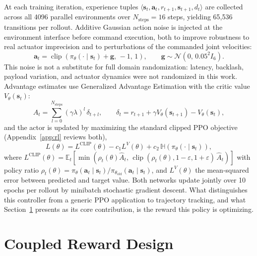 At each training iteration, experience tuples $\langle \mathbf{s}_t, \mathbf{a}_t, r_{t+1},
\mathbf{s}_{t+1}, d_t \rangle$ are collected across all 4096 parallel environments over
$N_{\text{steps}} = 16$ steps, yielding 65{,}536 transitions per rollout. Additive Gaussian action
noise is injected at the environment interface before command execution, both to improve robustness
to real actuator imprecision and to perturbations of the commanded joint velocities:
\begin{equation}
\mathbf{a}_t = \operatorname{clip}\left( \pi_\theta(\cdot \mid \mathbf{s}_t) + \mathbf{g},\, -1,\, 1 \right),
\qquad \mathbf{g} \sim \mathcal{N}(0,\, 0.05^2 I_6).
\label{eq:dikppo_actionnoise}
\end{equation}
This noise is not a substitute for full domain randomization: latency, backlash, payload variation,
and actuator dynamics were not randomized in this work. Advantage estimates use Generalized Advantage
Estimation with the critic value $V_\theta(\mathbf{s}_t)$:
\begin{equation}
\hat{A}_t = \sum_{l=0}^{N_{\text{steps}}} (\gamma \lambda)^l\, \delta_{t+l}, \qquad
\delta_t = r_{t+1} + \gamma V_\theta(\mathbf{s}_{t+1}) - V_\theta(\mathbf{s}_t),
\label{eq:dikppo_gae}
\end{equation}
and the actor is updated by maximizing the standard clipped PPO objective (Appendix~\ref{app:rl} reviews both),
\begin{equation}
L(\theta) = L^{\text{CLIP}}(\theta) - c_1 L^V(\theta) + c_2\, \mathbb{H}\!\left( \pi_\theta(\cdot \mid \mathbf{s}_t) \right),
\label{eq:dikppo_ppoloss}
\end{equation}
where $L^{\text{CLIP}}(\theta) = \mathbb{E}_t\!\left[ \min\!\left( \rho_t(\theta) \hat{A}_t,\,
\operatorname{clip}(\rho_t(\theta), 1-\varepsilon, 1+\varepsilon)\, \hat{A}_t \right) \right]$ with policy
ratio $\rho_t(\theta) = \pi_\theta(\mathbf{a}_t \mid \mathbf{s}_t) /
\pi_{\theta_{\text{old}}}(\mathbf{a}_t \mid \mathbf{s}_t)$, and $L^V(\theta)$ the mean-squared error
between predicted and target value. Both networks update jointly over 10 epochs per rollout by
minibatch stochastic gradient descent. What distinguishes this controller from a generic PPO
application to trajectory tracking, and what Section~\ref{sec:dikppo_reward} presents as its core
contribution, is the reward this policy is optimizing.

\section{Coupled Reward Design}\label{sec:dikppo_reward}

